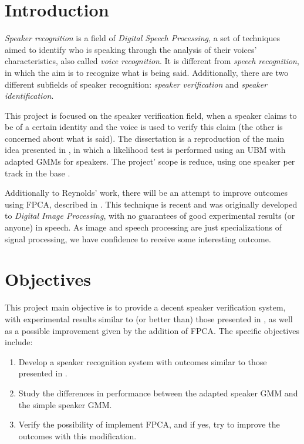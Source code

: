 \documentclass[a4paper,twocolumn]{article}
\begin{document}
\section{Introduction}
\label{ch:intro}

\textit{Speaker recognition} is a field of \textit{Digital Speech Processing}, a set of techniques aimed to identify who is speaking through the analysis of their voices' characteristics, also called \textit{voice recognition}. It is different from \textit{speech recognition}, in which the aim is to recognize what is being said. Additionally, there are two different subfields of speaker recognition: \textit{speaker verification} and \textit{speaker identification}.

This project is focused on the speaker verification field, when a speaker claims to be of a certain identity and the voice is used to verify this claim (the other is concerned about what is said). The dissertation is a reproduction of the main idea presented in \cite{reynolds_et_al_2000}, in which a likelihood test is performed using an UBM with adapted GMMs for speakers. The project' scope is reduce, using one speaker per track in the base \cite{corpus_paper}.

Additionally to Reynolds' work, there will be an attempt to improve outcomes using FPCA, described in \cite{gao_et_al_2013}. This technique is recent and was originally developed to \textit{Digital Image Processing}, with no guarantees of good experimental results (or anyone) in speech. As image and speech processing are just specializations of signal processing, we have confidence to receive some interesting outcome.


\section{Objectives}
\label{ch:objectives}

This project main objective is to provide a decent speaker verification system, with experimental results similar to (or better than) those presented in \cite{reynolds_et_al_2000}, as well as a possible improvement given by the addition of FPCA. The specific objectives include:

\begin{enumerate}
    \item Develop a speaker recognition system with outcomes similar to those presented in \cite{reynolds_et_al_2000}.
    \item Study the differences in performance between the adapted speaker GMM and the simple speaker GMM.
    \item Verify the possibility of implement FPCA, and if yes, try to improve the outcomes with this modification.
\end{enumerate}
\end{document}
